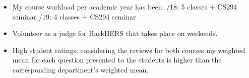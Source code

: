 \documentclass[11pt]{article}
\begin{document}
\begin{itemize}
  \item My course workload per academic year has been:
    /18: 5 classes + CS294 seminar 
    /19: 4 classes + CS294 seminar

  \item Volunteer as a judge for HackHERS that takes place on
    weekends.

  \item High student ratings: considering the reviews for both courses
    my weighted mean for each question presented to the students is
    higher than the corresponding department's weighted mean.
  
\end{itemize}
\end{document}
